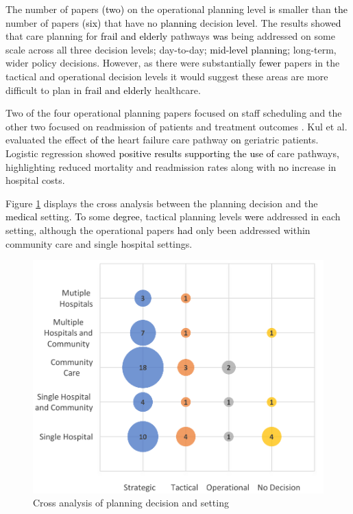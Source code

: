 \documentclass[../thesis.tex]{subfiles}
\begin{document}
The number of papers \textcolor{black}{(two)} on the operational planning level is smaller than \textcolor{black}{the} number of papers \textcolor{black}{(six)} that have no \textcolor{black}{planning} decision \textcolor{black}{level}. The results show\textcolor{black}{ed} that care planning for \textcolor{black}{frail and elderly} pathways \textcolor{black}{was} being addressed on some scale across all three decision levels\textcolor{black}{;} day\textcolor{black}{-}to\textcolor{black}{-}day\textcolor{black}{; mid-level planning;} long-term, wider policy decisions. However, as there were substantially \textcolor{black}{fewer} papers in the tactical and operational decision levels it would suggest these areas are more difficult to plan in \textcolor{black}{frail and elderly} healthcare.

Two of the four operational planning papers focused on staff scheduling \cite{Eveborn,Grenouilleau} and the other two focused on readmission of patients \cite{Gordon1} and treatment outcomes \cite{Kul}. Kul et al. \cite{Kul} evaluated the effect \textcolor{black}{of the} heart failure care pathway \textcolor{black}{on} geriatric patients. Logistic regression showed \textcolor{black}{positive results supporting the use of} care pathways\textcolor{black}{,} highlighting reduced mortality and readmission rates along with \textcolor{black}{no} increase in hospital costs.

Figure \ref{fig:PlanningSetting} displays the cross analysis between the planning decision and the \textcolor{black}{medical} setting. \textcolor{black}{To} some \textcolor{black}{degree}, tactical planning levels \textcolor{black}{were} addressed in each setting, although the operational papers \textcolor{black}{had} only been addressed within community care and single hospital settings. 

\begin{figure}[H]
\centering
        \includegraphics[scale = 0.6]{Chapter2/Figures/PlanningSetting1.pdf}
        \caption{Cross analysis of planning decision and setting}
    \label{fig:PlanningSetting}
\end{figure}
\end{document}
